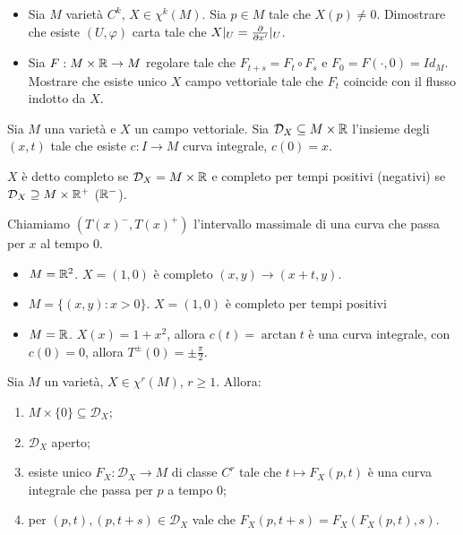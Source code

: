 \begin{exercise}
	\begin{itemize}
		\item Sia $M$ varietà $C^k$, $X\in\chi^k(M)$. Sia $p\in M$ tale che $X(p)\not=0$. Dimostrare che esiste $(U,\varphi)$ carta tale che $X|_U=\frac{\partial}{\partial x'}|_U$.
		\item Sia $F:M\times\mathbb R\to M$ regolare tale che $F_{t+s}=F_t\circ F_s$ e $F_0=F(\cdot,0)=Id_M$. Mostrare che esiste unico $X$ campo vettoriale tale che $F_t$ coincide con il flusso indotto da $X$.
	\end{itemize}
\end{exercise}

\begin{definition}
	Sia $M$ una varietà e $X$ un campo vettoriale. Sia $\mathcal D_X\subseteq M\times \mathbb R$ l'insieme degli $(x,t)$ tale che esiste $c:I\to M$ curva integrale, $c(0)=x$.
	
	$X$ è detto completo se $\mathcal D_X=M\times \mathbb R$ e completo per tempi positivi (negativi) se $\mathcal D_X\supseteq M\times\mathbb R^+$ ($\mathbb R^-$).
	
	Chiamiamo $(T(x)^-,T(x)^+)$ l'intervallo massimale di una curva che passa per $x$ al tempo 0. 
\end{definition}

\begin{example}
\begin{itemize}
	\item $M=\mathbb R^2$. $X=(1,0)$ è completo $(x,y)\to (x+t,y)$.
	\item $M=\{(x,y):x>0\}$. $X=(1,0)$ è completo per tempi positivi
	\item $M=\mathbb R$. $X(x)=1+x^2$, allora $c(t)=\arctan t$ è una curva integrale, con $c(0)=0$, allora $T^\pm(0)=\pm \frac \pi 2$.
\end{itemize}
\end{example}

\begin{proposition}
	Sia $M$ un varietà, $X\in \chi^r(M)$, $r\ge 1$. Allora:
	\begin{enumerate}
	 \item $M\times\{0\}\subseteq \mathcal D_X$;
	 \item $\mathcal D_X$ aperto;
	 \item esiste unico $F_X:\mathcal D_X\to M$ di classe $C^r$ tale che $t\mapsto F_X(p,t)$ è una curva integrale che passa per $p$ a tempo 0;
	 \item per $(p,t),(p,t+s)\in\mathcal D_X$ vale che $F_X(p,t+s)=F_X(F_X(p,t),s)$.
	\end{enumerate}
\end{proposition}

